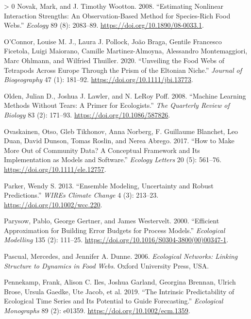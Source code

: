 \documentclass[11pt]{article}
\newlength{\cslhangindent}
\newenvironment{CSLReferences}[3] %
 {%
  \setlength{\parindent}{0pt}
  \ifodd #1 \everypar{\setlength{\hangindent}{\cslhangindent}}\ignorespaces\fi
  \ifnum #2 > 0
  \setlength{\parskip}{#2\baselineskip}
  \fi
 }%
 {}
\begin{document}
\begin{CSLReferences}{1}{0}
\leavevmode\hypertarget{ref-Novak2008EstNon}{}%
Novak, Mark, and J. Timothy Wootton. 2008. {``Estimating Nonlinear
Interaction Strengths: An Observation-Based Method for Species-Rich Food
Webs.''} \emph{Ecology} 89 (8): 2083--89.
\url{https://doi.org/10.1890/08-0033.1}.

\leavevmode\hypertarget{ref-OConnor2020UnvFoo}{}%
O'Connor, Louise M. J., Laura J. Pollock, João Braga, Gentile Francesco
Ficetola, Luigi Maiorano, Camille Martinez-Almoyna, Alessandro
Montemaggiori, Marc Ohlmann, and Wilfried Thuiller. 2020. {``Unveiling
the Food Webs of Tetrapods Across Europe Through the Prism of the
Eltonian Niche.''} \emph{Journal of Biogeography} 47 (1): 181--92.
\url{https://doi.org/10.1111/jbi.13773}.

\leavevmode\hypertarget{ref-Olden2008MacLea}{}%
Olden, Julian D., Joshua J. Lawler, and N. LeRoy Poff. 2008. {``Machine
Learning Methods Without Tears: A Primer for Ecologists.''} \emph{The
Quarterly Review of Biology} 83 (2): 171--93.
\url{https://doi.org/10.1086/587826}.

\leavevmode\hypertarget{ref-Ovaskainen2017HowMak}{}%
Ovaskainen, Otso, Gleb Tikhonov, Anna Norberg, F. Guillaume Blanchet,
Leo Duan, David Dunson, Tomas Roslin, and Nerea Abrego. 2017. {``How to
Make More Out of Community Data? A Conceptual Framework and Its
Implementation as Models and Software.''} \emph{Ecology Letters} 20 (5):
561--76. \url{https://doi.org/10.1111/ele.12757}.

\leavevmode\hypertarget{ref-Parker2013EnsMod}{}%
Parker, Wendy S. 2013. {``Ensemble Modeling, Uncertainty and Robust
Predictions.''} \emph{WIREs Climate Change} 4 (3): 213--23.
\url{https://doi.org/10.1002/wcc.220}.

\leavevmode\hypertarget{ref-Parysow2000EffApp}{}%
Parysow, Pablo, George Gertner, and James Westervelt. 2000. {``Efficient
Approximation for Building Error Budgets for Process Models.''}
\emph{Ecological Modelling} 135 (2): 111--25.
\url{https://doi.org/10.1016/S0304-3800(00)00347-1}.

\leavevmode\hypertarget{ref-Pascual2006EcoNet}{}%
Pascual, Mercedes, and Jennifer A. Dunne. 2006. \emph{Ecological
Networks: Linking Structure to Dynamics in Food Webs}. Oxford University
Press, USA.

\leavevmode\hypertarget{ref-Pennekamp2019IntPre}{}%
Pennekamp, Frank, Alison C. Iles, Joshua Garland, Georgina Brennan,
Ulrich Brose, Ursula Gaedke, Ute Jacob, et al. 2019. {``The Intrinsic
Predictability of Ecological Time Series and Its Potential to Guide
Forecasting.''} \emph{Ecological Monographs} 89 (2): e01359.
\url{https://doi.org/10.1002/ecm.1359}.


\end{CSLReferences}
\end{document}
